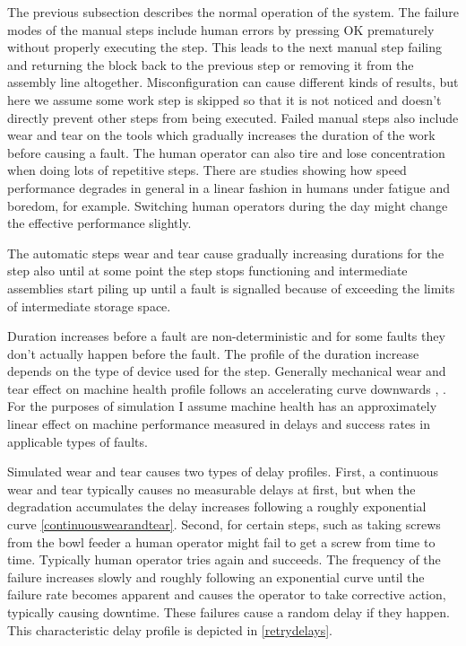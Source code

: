 \documentclass[journal]{IEEEtran}
\begin{document}
The previous subsection describes the normal operation of the system. The failure modes of the manual steps include human errors by pressing OK
prematurely without properly executing the step. This leads to the next manual step failing and returning the block back to the previous step or
removing it from the assembly line altogether. Misconfiguration can cause different kinds of results, but here we assume some work step is skipped
so that it is not noticed and doesn't directly prevent other steps from being executed. Failed manual steps also include wear and tear
on the tools which gradually increases the duration of the work before causing a fault. The human operator can also tire and lose concentration
when doing lots of repetitive steps. There are studies showing how speed performance degrades in general in a linear fashion in humans
under fatigue and boredom, for example\cite{fatigue}. Switching human operators during the day might change the effective performance slightly.

The automatic steps wear and tear cause gradually increasing durations for the step also until at some point the step stops functioning and
intermediate assemblies start piling up until a fault is signalled because of exceeding the limits of intermediate storage space.

Duration increases before a fault are non-deterministic and for some faults they don't actually happen before the fault. The profile of the duration
increase depends on the type of device used for the step. Generally mechanical wear and tear effect on machine health profile follows
an accelerating curve downwards \cite{eker2012major}, \cite{milldataset}. For the purposes of simulation I assume machine health has an approximately
linear effect on machine performance measured in delays and success rates in applicable types of faults.

Simulated wear and tear causes two types of delay profiles. First,
a continuous wear and tear typically causes no measurable delays at first, but when the degradation accumulates the delay increases following
a roughly exponential curve \ref{continuouswearandtear}. Second, for certain steps, such as taking screws from the bowl feeder a human operator
might fail to get a screw from time to time. Typically human operator tries again and succeeds. The frequency of the failure increases
slowly and roughly following an exponential curve until the failure rate becomes apparent and causes the operator to take corrective action,
typically causing downtime. These failures cause a random delay if they happen. This characteristic delay profile is depicted in \ref{retrydelays}.
\end{document}
